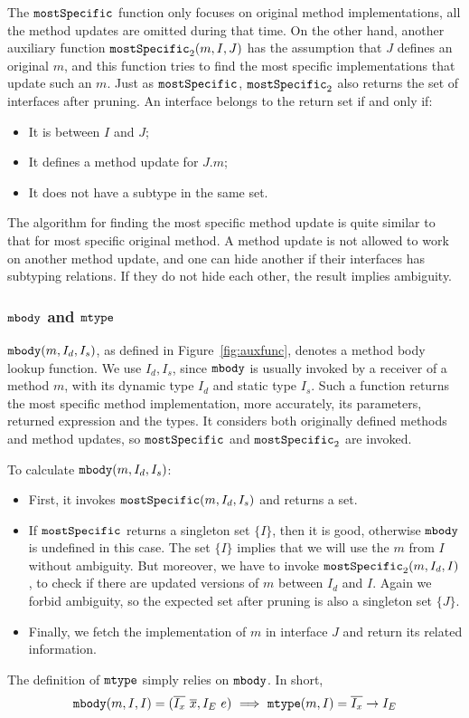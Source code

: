 The $\texttt{mostSpecific}$ function only focuses on original method implementations, all the method updates are omitted during that time. On the other hand, another auxiliary function $\texttt{mostSpecific}_2(m, I, J)$ has the assumption that $J$ defines an original $m$, and this function tries to find the most specific implementations that update such an $m$. Just as $\texttt{mostSpecific}$, $\texttt{mostSpecific}_2$ also returns the set of interfaces after pruning. An interface belongs to the return set if and only if:
\begin{itemize}
	\item It is between $I$ and $J$;
	\item It defines a method update for $J.m$;
	\item It does not have a subtype in the same set.
\end{itemize}
The algorithm for finding the most specific method update is quite similar to that for most specific original method. A method update is not allowed to work on another method update, and one can hide another if their interfaces has subtyping relations. If they do not hide each other, the result implies ambiguity.

\subsubsection{$\texttt{mbody}$ and $\texttt{mtype}$}

$\texttt{mbody}(m, I_d, I_s)$, as defined in Figure~\ref{fig:auxfunc}, denotes a method body lookup function.
We use $I_d, I_s$, since $\texttt{mbody}$ is usually invoked by a receiver of a method $m$, with its dynamic
type $I_d$ and static type $I_s$. Such a function returns the most specific method implementation, more
accurately, its parameters, returned expression and the types. It considers both originally defined methods and method updates, so $\texttt{mostSpecific}$ and $\texttt{mostSpecific}_2$ are invoked.

To calculate $\texttt{mbody}(m, I_d, I_s)$:
\begin{itemize}
	\item First, it invokes $\texttt{mostSpecific}(m, I_d, I_s)$ and returns a set.
	\item If $\texttt{mostSpecific}$ returns a singleton set $\{I\}$, then it is good, otherwise $\texttt{mbody}$ is undefined in
	this case. The set $\{I\}$ implies that we will use the $m$ from $I$ without ambiguity. But moreover, we have to invoke $\texttt{mostSpecific}_2(m, I_d, I)$, to check if there are updated versions of $m$ between $I_d$ and $I$. Again we forbid ambiguity, so the expected set after pruning is also a singleton set $\{J\}$.
	\item Finally, we fetch the implementation of $m$ in interface $J$ and return its related information.
\end{itemize}
The definition of $\texttt{mtype}$ simply relies on $\texttt{mbody}$. In short,
$$\texttt{mbody}(m, I, I) = (\overline{I_x}\ \overline{x}, I_E\ e) \ \Longrightarrow\ \texttt{mtype}(m, I) = \overline{I_x}\rightarrow I_E$$

